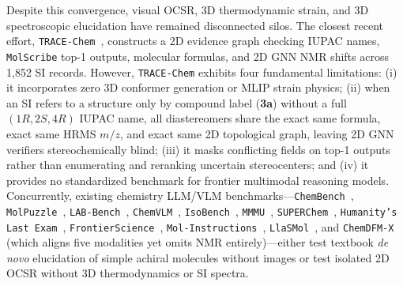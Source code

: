 \documentclass[10pt,twocolumn]{article}
\begin{document}
Despite this convergence, visual OCSR, 3D thermodynamic strain, and 3D spectroscopic elucidation have remained disconnected silos. The closest recent effort, \texttt{TRACE-Chem}~\cite{Liu2026TRACEChem}, constructs a 2D evidence graph checking IUPAC names, \texttt{MolScribe} top-1 outputs, molecular formulas, and 2D GNN NMR shifts across 1,852 SI records. However, \texttt{TRACE-Chem} exhibits four fundamental limitations: (i) it incorporates zero 3D conformer generation or MLIP strain physics; (ii) when an SI refers to a structure only by compound label (\textbf{3a}) without a full $(1R,2S,4R)$ IUPAC name, all diastereomers share the exact same formula, exact same HRMS $m/z$, and exact same 2D topological graph, leaving 2D GNN verifiers stereochemically blind; (iii) it masks conflicting fields on top-1 outputs rather than enumerating and reranking uncertain stereocenters; and (iv) it provides no standardized benchmark for frontier multimodal reasoning models. Concurrently, existing chemistry LLM/VLM benchmarks---\texttt{ChemBench}~\cite{Mirza2025ChemBench}, \texttt{MolPuzzle}~\cite{Guo2024MolPuzzle}, \texttt{LAB-Bench}~\cite{Laurent2024LABBench}, \texttt{ChemVLM}~\cite{Li2025ChemVLM}, \texttt{IsoBench}~\cite{Fu2024IsoBench}, \texttt{MMMU}~\cite{Yue2024MMMU}, \texttt{SUPERChem}~\cite{Zhao2025SUPERChem}, \texttt{Humanity's Last Exam}~\cite{Phan2025HLE}, \texttt{FrontierScience}~\cite{Wang2026FrontierScience}, \texttt{Mol-Instructions}~\cite{Fang2024MolInstructions}, \texttt{LlaSMol}~\cite{Yu2024LlaSMol}, and \texttt{ChemDFM-X}~\cite{Zhao2024ChemDFMX} (which aligns five modalities yet omits NMR entirely)---either test textbook \emph{de novo} elucidation of simple achiral molecules without images or test isolated 2D OCSR without 3D thermodynamics or SI spectra.
\end{document}
